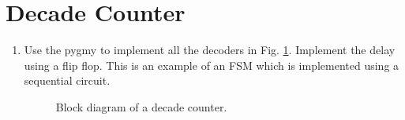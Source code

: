 \documentclass[journal,12pt,twocolumn]{IEEEtran}
\renewcommand\thesection{\arabic{section}}
\begin{document}
\section{Decade Counter }
\renewcommand{\theequation}{\theenumi}
\renewcommand{\thefigure}{\theenumi}
\begin{enumerate}[label=\thesection.\arabic*.,ref=\thesection.\theenumi]

\item Use the pygmy to implement all the decoders in Fig.  \ref{fig:vaman_decade_counter}.  Implement the delay using a flip flop.  This is an 
example of an FSM which is implemented using a sequential circuit.

\begin{figure}[!ht]
\centering
\resizebox{\columnwidth}{!}{

}
\caption{Block diagram of a decade counter.}
\label{fig:vaman_decade_counter}
\end{figure}


\end{enumerate}
%
\end{document}
